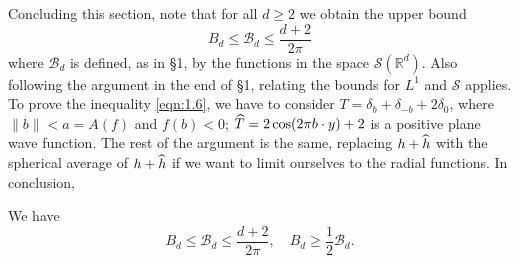 Concluding this section, note that for all $d \geq 2$ we obtain the upper bound
\begin{equation}
    \label{eqn:3.11}
    B_d \leq \mathcal{B}_{d} \leq \frac{d+2}{2\pi}
\end{equation}
where $\mathcal{B}_{d}$ is defined, as in \S 1, by the functions in the space $\mathcal{S}(\mathbb{R}^{d})$.
Also following the argument in the end of \S 1, relating the bounds for $L^1$ and $\mathcal{S}$ applies.
To prove the inequality \eqref{eqn:1.6}, we have to consider $T = \delta_b + \delta_{-b} + 2 \delta_{0}$, where $\|b\| < a = A(f)$ and $f(b) < 0$; $\widehat{T} = 2 \cos(2 \pi b \cdot y) + 2$ is a positive plane wave function.
The rest of the argument is the same, replacing $h + \widehat{h}$ with the spherical average of $h + \widehat{h}$ if we want to limit ourselves to the radial functions.
In conclusion,
\begin{theorem}
\label{thm:3.2}
We have
\begin{equation}
    \label{eqn:3.12}
    B_d \leq \mathcal{B}_{d} \leq \frac{d+2}{2 \pi}, \quad B_d \geq \frac{1}{2} \mathcal{B}_d.
\end{equation}
\end{theorem}

